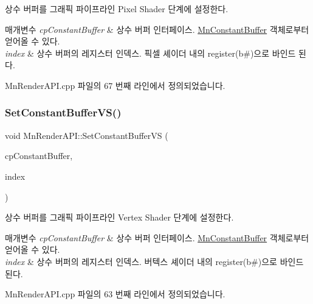 상수 버퍼를 그래픽 파이프라인 Pixel Shader 단계에 설정한다. 


\begin{DoxyParams}{매개변수}
{\em cp\+Constant\+Buffer} & 상수 버퍼 인터페이스. \hyperlink{class_m_n_l_1_1_mn_constant_buffer}{Mn\+Constant\+Buffer} 객체로부터 얻어올 수 있다. \\
\hline
{\em index} & 상수 버퍼의 레지스터 인덱스. 픽셀 셰이더 내의 register(b\#)으로 바인드 된다. \\
\hline
\end{DoxyParams}


Mn\+Render\+A\+P\+I.\+cpp 파일의 67 번째 라인에서 정의되었습니다.

\mbox{\label{class_m_n_l_1_1_mn_render_a_p_i_a52a0598b6ec9617a3019dfa844eab208}} 
\subsubsection{\texorpdfstring{Set\+Constant\+Buffer\+V\+S()}{SetConstantBufferVS()}}
{\footnotesize\ttfamily void Mn\+Render\+A\+P\+I\+::\+Set\+Constant\+Buffer\+VS (\begin{DoxyParamCaption}\item[{const \hyperlink{namespace_m_n_l_aab9c90a8c27ac6410a9cc7cd89efeef1}{C\+P\+D3\+D\+Buffer} \&}]{cp\+Constant\+Buffer,  }\item[{U\+I\+NT}]{index }\end{DoxyParamCaption})}



상수 버퍼를 그래픽 파이프라인 Vertex Shader 단계에 설정한다. 


\begin{DoxyParams}{매개변수}
{\em cp\+Constant\+Buffer} & 상수 버퍼 인터페이스. \hyperlink{class_m_n_l_1_1_mn_constant_buffer}{Mn\+Constant\+Buffer} 객체로부터 얻어올 수 있다. \\
\hline
{\em index} & 상수 버퍼의 레지스터 인덱스. 버텍스 셰이더 내의 register(b\#)으로 바인드 된다. \\
\hline
\end{DoxyParams}


Mn\+Render\+A\+P\+I.\+cpp 파일의 63 번째 라인에서 정의되었습니다.

